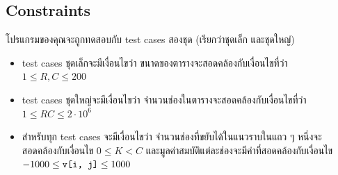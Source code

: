 \subsection*{\sectionfont\upshape Constraints}

โปรแกรมของคุณจะถูกทดสอบกับ test cases สองชุด (เรียกว่าชุดเล็ก และชุดใหญ่)
\begin{itemize}
\item test cases ชุดเล็กจะมีเงื่อนไขว่า 
    ขนาดของตารางจะสอดคล้องกับเงื่อนไขที่ว่า \\ $1 \leq R, C \leq 200$
\item test cases ชุดใหญ่จะมีเงื่อนไขว่า 
    จำนวนช่องในตารางจะสอดคล้องกับเงื่อนไขที่ว่า \\ $1 \leq RC \leq 2 \cdot 10^6$
\item สำหรับทุก test cases จะมีเงื่อนไขว่า 
    จำนวนช่องที่ขยับได้ในแนวราบในแถว ๆ หนึ่งจะสอดคล้องกับเงื่อนไข $0 \leq K < C$ 
    และมูลค่าสมบัติแต่ละช่องจะมีค่าที่สอดคล้องกับเงื่อนไข 
    $-1000 \leq \text{\ttfamily v[i, j]} \leq 1000$
\end{itemize}
